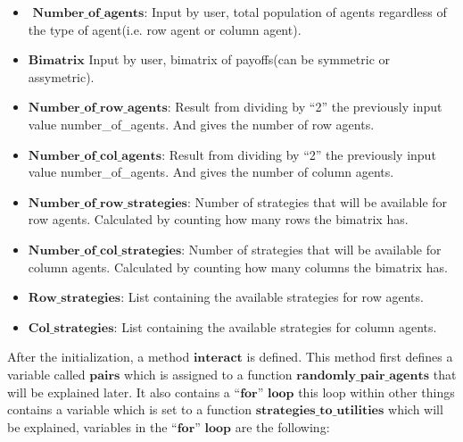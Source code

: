 \documentclass{article}
\begin{document}
\begin{itemize}
\item $\textbf{ Number\_of\_agents:}$ Input by user, total population of agents regardless of the type of agent(i.e. row agent or column agent).
\item $\textbf{Bimatrix}$ Input by user, bimatrix of payoffs(can be symmetric or assymetric).
\item $\textbf{Number\_of\_row\_agents:}$ Result from dividing by “2” the previously input value number\_of\_agents. And gives the number of row agents.
\item $\textbf{Number\_of\_col\_agents:}$ Result from dividing by “2” the previously input value number\_of\_agents. And gives the number of column agents.
\item $\textbf{Number\_of\_row\_strategies:}$ Number of strategies that will be available for row agents. Calculated by counting how many rows the bimatrix has.
\item $\textbf{Number\_of\_col\_strategies:}$ Number of strategies that will be available for column agents. Calculated by counting how many columns the bimatrix has.
\item $\textbf{Row\_strategies:}$ List containing the available strategies for row agents.
\item $\textbf{Col\_strategies:}$ List containing the available strategies for column agents.
\end{itemize}

After the initialization, a method $\textbf{interact}$ is defined. This method first defines a variable called $\textbf{pairs}$ which is assigned to a function $\textbf{randomly\_pair\_agents}$ that will be explained later. It also contains a $\textbf{``for'' loop}$ this loop within other things contains a variable which is set to a function $\textbf{strategies\_to\_utilities}$ which will be explained, variables in the $\textbf{``for'' loop}$ are the following:
\end{document}
